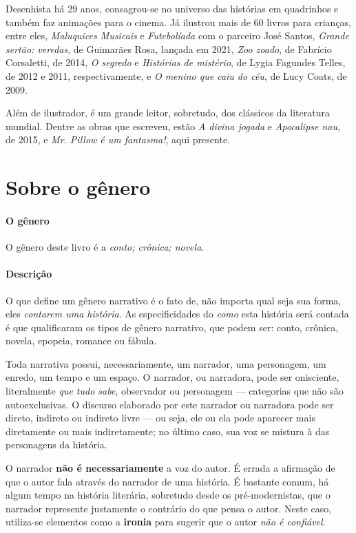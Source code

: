 \documentclass[11pt]{extarticle}
\begin{document}
Desenhista há 29 anos, consagrou-se no universo das histórias em quadrinhos e também faz animações para o cinema. 
Já ilustrou mais de 60 livros para crianças, entre eles, \textit{Maluquices Musicais} e \textit{Futebolíada} com o parceiro José Santos, \textit{Grande sertão: veredas}, de Guimarães Rosa, lançada em 2021,
\textit{Zoo zoado}, de Fabrício Corsaletti, de 2014, \textit{O segredo} e \textit{Histórias de mistério}, de Lygia Fagundes Telles, de 2012 e 2011, respectivamente, e \textit{O menino que caiu do céu}, de Lucy Coats, de 2009.

Além de ilustrador, é um grande leitor, sobretudo, dos clássicos da literatura mundial.
Dentre as obras que escreveu, estão \textit{A divina jogada} e \textit{Apocalipse nau}, de 2015, e \textit{Mr. Pillow é um fantasma!}, aqui presente.


\section{Sobre o gênero}

\paragraph{O gênero} O gênero deste livro é a \textit{conto; crônica; novela}. 

\paragraph{Descrição} O que define um gênero narrativo é o fato de, não importa
qual seja sua forma, eles \textit{contarem uma história}.
As especificidades do \textit{como} esta história será contada é que
qualificaram os tipos de gênero narrativo, que podem ser: conto, crônica, novela,
epopeia, romance ou fábula. 

Toda narrativa possui, necessariamente, um narrador, uma personagem, um enredo,
um tempo e um espaço. O narrador, ou narradora, pode ser onisciente, literalmente
\textit{que tudo sabe}, observador ou personagem --- categorias que não são autoexclusivas.
O discurso elaborado por este narrador ou narradora pode ser direto, indireto ou indireto livre 
--- ou seja, ele ou ela pode aparecer mais diretamente ou mais indiretamente; no último caso,
sua voz se mistura à das personagens da história.

O narrador \textbf{não é necessariamente} a voz do autor. É errada a afirmação
de que o autor fala através do narrador de uma história. É bastante comum,
há algum tempo na história literária, sobretudo desde os pré-modernistas, que 
o narrador represente justamente o contrário do que pensa o autor. Neste caso, 
utiliza-se elementos como a \textbf{ironia} para sugerir que o autor \textit{não é confiável}.
\end{document}
